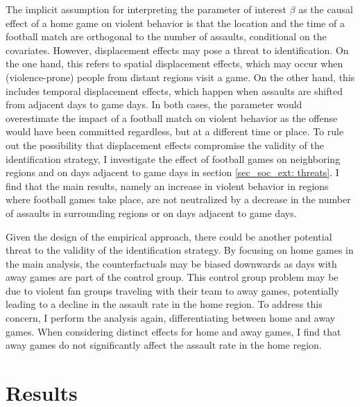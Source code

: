 The implicit assumption for interpreting the parameter of interest $\beta$ as the causal effect of a home game on violent behavior is that the location and the time of a football match are orthogonal to the number of assaults, conditional on the covariates. However, displacement effects may pose a threat to identification. On the one hand, this refers to spatial displacement effects, which may occur when (violence-prone) people from distant regions visit a game. On the other hand, this includes temporal displacement effects, which happen when assaults are shifted from adjacent days to game days. In both cases, the parameter would overestimate the impact of a football match on violent behavior as the offense would have been committed regardless, but at a different time or place. To rule out the possibility that displacement effects compromise the validity of the identification strategy, I investigate the effect of football games on neighboring regions and on days adjacent to game days in section \ref{sec_soc_ext: threats}. I find that the main results, namely an increase in violent behavior in regions where football games take place, are not neutralized by a decrease in the number of assaults in surrounding regions or on days adjacent to game days.


Given the design of the empirical approach, there could be another potential threat to the validity of the identification strategy. By focusing on home games in the main analysis, the counterfactuals may be biased downwards as days with away games are part of the control group. This control group problem may be due to violent fan groups traveling with their team to away games, potentially leading to a decline in the assault rate in the home region. To address this concern, I perform the analysis again, differentiating between home and away games. When considering distinct effects for home and away games, I find that away games do not significantly affect the assault rate in the home region. 









\bigskip
\section{Results}\label{sec_soc_ext:results}



